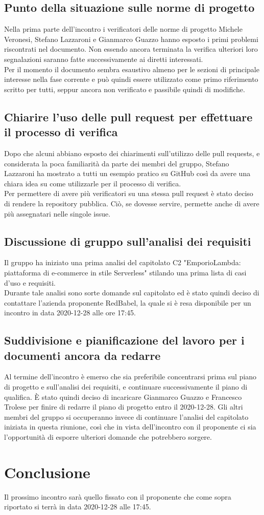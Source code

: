 \subsection{Punto della situazione sulle norme di progetto} 
Nella prima parte dell'incontro i verificatori delle norme di progetto Michele Veronesi, Stefano Lazzaroni e Gianmarco Guazzo hanno esposto i primi problemi riscontrati nel documento. Non essendo ancora terminata la verifica ulteriori loro segnalazioni saranno fatte successivamente ai diretti interessati.\\
Per il momento il documento sembra esaustivo almeno per le sezioni di principale interesse nella fase corrente e può quindi essere utilizzato come primo riferimento scritto per tutti, seppur ancora non verificato e passibile quindi di modifiche.

\subsection{Chiarire l'uso delle pull request per effettuare il processo di verifica}
Dopo che alcuni abbiano esposto dei chiarimenti sull'utilizzo delle pull requests, e considerata la poca familiarità da parte dei membri del gruppo, Stefano Lazzaroni ha mostrato a tutti un esempio pratico su GitHub così da avere una chiara idea su come utilizzarle per il processo di verifica.\\
Per permettere di avere più verificatori su una stessa pull request è stato deciso di rendere la repository pubblica. Ciò, se dovesse servire, permette anche di avere più assegnatari nelle singole issue.

\subsection{Discussione di gruppo sull'analisi dei requisiti}
Il gruppo ha iniziato una prima analisi del capitolato C2 "EmporioLambda: piattaforma di e-commerce in stile Serverless" stilando una prima lista di casi d'uso e requisiti.\\
Durante tale analisi sono sorte domande sul capitolato ed è stato quindi deciso di contattare l'azienda proponente RedBabel, la quale si è resa disponibile per un incontro in data 2020-12-28 alle ore 17:45.

\subsection{Suddivisione e pianificazione del lavoro per i documenti ancora da redarre} 
Al termine dell'incontro è emerso che sia preferibile concentrarsi prima sul piano di progetto e sull'analisi dei requisiti, e continuare successivamente il piano di qualifica.
È stato quindi deciso di incaricare Gianmarco Guazzo e Francesco Trolese per finire di redarre il piano di progetto entro il 2020-12-28. Gli altri membri del gruppo si occuperanno invece di continuare l'analisi del capitolato iniziata in questa riunione, così che in vista dell'incontro con il proponente ci sia l'opportunità di esporre ulteriori domande che potrebbero sorgere.

\section{Conclusione}
Il prossimo incontro sarà quello fissato con il proponente che come sopra riportato si terrà in data 2020-12-28 alle 17:45.

